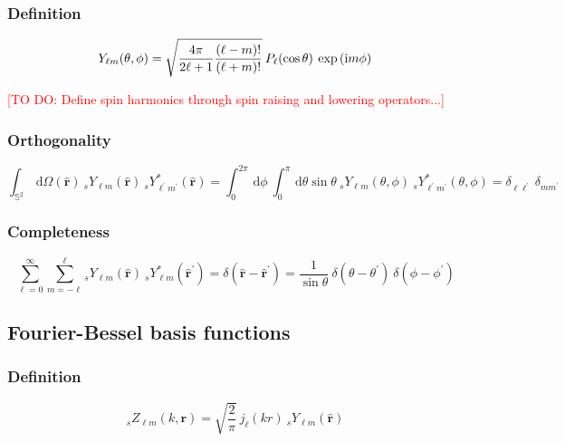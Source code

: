 \documentclass[a4paper,11pt]{article}
\newcommand{\sphere}{\ensuremath{{\mathbb{S}^2}}}
\newcommand{\dx}{\ensuremath{\mathrm{\,d}}}
\newcommand{\im}{{\rm i}}
\newcommand{\rvec}{{\boldsymbol{r}}}
\newcommand{\rang}{{\boldsymbol{\hat{r}}}}
\newcommand{\rlen}{{r}}
\newcommand{\todo}[1]{\textcolor{red}{[TO DO: #1]}}
\begin{document}
\subsubsection{Definition}

\begin{equation}
  Y_{\ell m}(\theta, \phi) = 
  \sqrt{\frac{4\pi}{2\ell+1} \frac{(\ell-m)!}{(\ell+m)!}} \:
  P_\ell(\cos\theta) \:
  \exp{(\im m \phi)}
\end{equation}

\todo{Define spin harmonics through spin raising and lowering operators...}



\subsubsection{Orthogonality}

\begin{equation}
  \int_\sphere \dx \Omega(\rang) \:
  {}_s Y_{\ell m}(\rang) \:
  {}_s Y_{\ell^\prime m^\prime}^\ast(\rang) 
  = 
  \int_0^{2\pi} \dx \phi \:
  \int_0^{\pi} \dx \theta \sin\theta \:
  {}_s Y_{\ell m}(\theta, \phi) \:
  {}_s Y_{\ell^\prime m^\prime}^\ast(\theta, \phi) 
  = 
  \delta_{\ell \ell^\prime} \:
  \delta_{m m^\prime}
\end{equation}

\subsubsection{Completeness}

\begin{equation}
  \sum_{\ell=0}^\infty \sum_{m=-\ell}^{\ell}
  {}_s Y_{\ell m}(\rang) \:
  {}_s Y_{\ell m}^\ast(\rang^\prime) 
  = 
  \delta(\rang-\rang^\prime)
  = 
  \frac{1}{\sin\theta} \:
  \delta(\theta-\theta^\prime) \:
  \delta(\phi-\phi^\prime)
\end{equation}


\subsection{Fourier-Bessel basis functions}

\subsubsection{Definition}

\begin{equation}
  {}_s Z_{\ell m}(k, \rvec) 
  = \sqrt{\frac{2}{\pi}}\:
  j_\ell(k \rlen) \: {}_s Y_{\ell m}(\rang) 
\end{equation}
\end{document}
